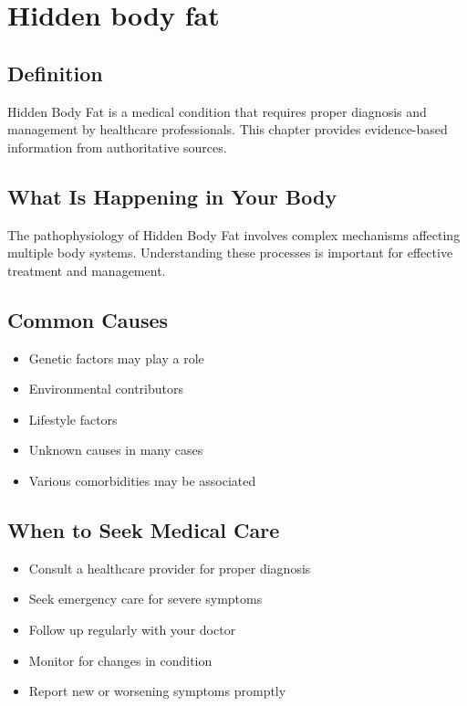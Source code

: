 
\chapter{Hidden body fat}

\section*{Definition}
Hidden Body Fat is a medical condition that requires proper diagnosis and management by healthcare professionals. This chapter provides evidence-based information from authoritative sources.

\section*{What Is Happening in Your Body}
The pathophysiology of Hidden Body Fat involves complex mechanisms affecting multiple body systems. Understanding these processes is important for effective treatment and management.

\section*{Common Causes}
\begin{itemize}
  \item Genetic factors may play a role
  \item Environmental contributors
  \item Lifestyle factors
  \item Unknown causes in many cases
  \item Various comorbidities may be associated
\end{itemize}

\section*{When to Seek Medical Care}
\begin{itemize}
  \item Consult a healthcare provider for proper diagnosis
  \item Seek emergency care for severe symptoms
  \item Follow up regularly with your doctor
  \item Monitor for changes in condition
  \item Report new or worsening symptoms promptly
\end{itemize}

